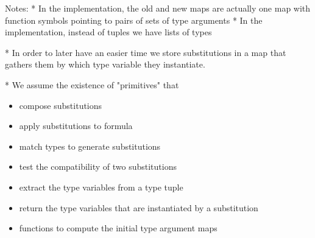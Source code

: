 \documentclass[]{ceurart}
\begin{document}
Notes:
   * In the implementation, the old and new maps are actually one map with function symbols pointing to pairs of sets of type arguments
   * In the implementation, instead of tuples we have lists of types

   * In order to later have an easier time we store substitutions in a map that gathers them by which type variable they instantiate.

   * We assume the existence of "primitives" that
   \begin{itemize}
      \item compose substitutions
      \item apply substitutions to formula
      \item match types to generate substitutions
      \item test the compatibility of two substitutions
      \item extract the type variables from a type tuple
      \item return the type variables that are instantiated by a substitution
      \item functions to compute the initial type argument maps
   \end{itemize}
\end{document}
